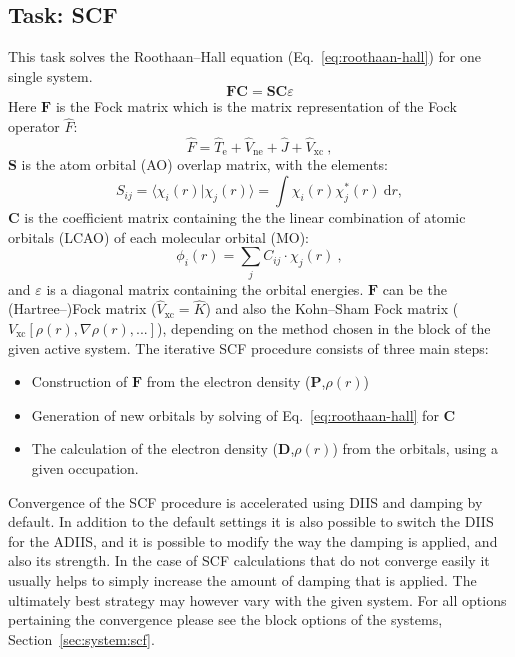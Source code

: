 \subsection{Task: SCF}
This task solves the Roothaan--Hall equation (Eq.~\ref{eq:roothaan-hall}) for one single system.
\begin{equation}\label{eq:roothaan-hall}
\textbf{F}\textbf{C} =  \textbf{S}\textbf{C}\varepsilon
\end{equation}
Here $\textbf{F}$ is the Fock matrix which is the matrix representation of the Fock operator $\hat{F}$:
\begin{equation}\label{eq:fockop}
\hat{F} = \hat{T}_{\text{e}} + \hat{V}_{\text{ne}} + \hat{J} + \hat{V}_{\text{xc}}~,
\end{equation}
$\textbf{S}$ is the atom orbital (AO) overlap matrix, with the elements:
\begin{equation}
S_{ij} = \langle \chi_i(r) | \chi_j(r) \rangle= \int \chi_i(r) \chi^*_j(r) ~\text{d}r,
\end{equation}
$\textbf{C}$ is the coefficient matrix containing the the linear combination of atomic orbitals (LCAO) of
each molecular orbital (MO):
\begin{equation}
\phi_i(r) = \sum_j C_{ij} \cdot \chi_j(r)~,
\end{equation}
and $\varepsilon$ is a diagonal matrix containing the orbital energies.
$\textbf{F}$ can be the (Hartree--)Fock matrix ($\hat{V}_{\text{xc}} = \hat{K}$) and also the Kohn--Sham Fock matrix ($V_{\text{xc}}[\rho(r),\nabla\rho(r),...]$), depending on the method chosen
in the  block of the given active system.
The iterative SCF procedure consists of three main steps:
\begin{itemize}
	\item Construction of $\textbf{F}$ from the electron density ($\textbf{P}$,$\rho(r)$)
	\item Generation of new orbitals by solving of Eq.~\ref{eq:roothaan-hall} for $\textbf{C}$
	\item The calculation of the electron density ($\textbf{D}$,$\rho(r)$) from the orbitals, using a given occupation.
\end{itemize}
Convergence of the SCF procedure is accelerated using DIIS\cite{pula1982} and damping by default.
In addition to the default settings it is also possible to switch the DIIS\cite{pula1982} for the ADIIS\cite{hu2010},
and it is possible to modify the way the damping is applied, and also its strength.
In the case of SCF calculations that do not converge easily it usually helps to simply increase the amount of damping that is
applied.
The ultimately best strategy may however vary with the given system.
For all options pertaining the convergence please see the  block options of the systems, Section~\ref{sec:system:scf}.
